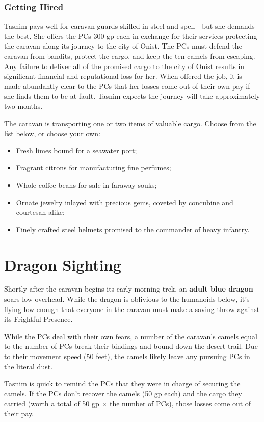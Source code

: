 \documentclass[10pt,a4paper,twoside,bg=print,twocolumn,openany,nodeprecatedcode]{dndbook}
\begin{document}
\subsubsection{Getting Hired}
Tasnim pays well for caravan guards skilled in steel and spell—but she demands the best. She offers the PCs 300 gp each in exchange for their services protecting the caravan along its journey to the city of Onist. The PCs must defend the caravan from bandits, protect the cargo, and keep the ten camels from escaping. Any failure to deliver all of the promised cargo to the city of Onist results in significant financial and reputational loss for her. When offered the job, it is made abundantly clear to the PCs that her losses come out of their own pay if she finds them to be at fault. Tasnim expects the journey will take approximately two months.

The caravan is transporting one or two items of valuable cargo. Choose from the list below, or choose your own:


\begin{itemize}
\item Fresh limes bound for a seawater port;
\item Fragrant citrons for manufacturing fine perfumes;
\item Whole coffee beans for sale in faraway souks;
\item Ornate jewelry inlayed with precious gems, coveted by concubine and courtesan alike;
\item Finely crafted steel helmets promised to the commander of heavy infantry.
\end{itemize}

\section{Dragon Sighting}
Shortly after the caravan begins its early morning trek, an \textbf{adult blue dragon} soars low overhead. While the dragon is oblivious to the humanoids below, it's flying low enough that everyone in the caravan must make a saving throw against its Frightful Presence.

While the PCs deal with their own fears, a number of the caravan's camels equal to the number of PCs break their bindings and bound down the desert trail. Due to their movement speed (50 feet), the camels likely leave any pursuing PCs in the literal dust.

Tasnim is quick to remind the PCs that they were in charge of securing the camels. If the PCs don't recover the camels (50 gp each) and the cargo they carried (worth a total of 50 gp × the number of PCs), those losses come out of their pay.
\end{document}
